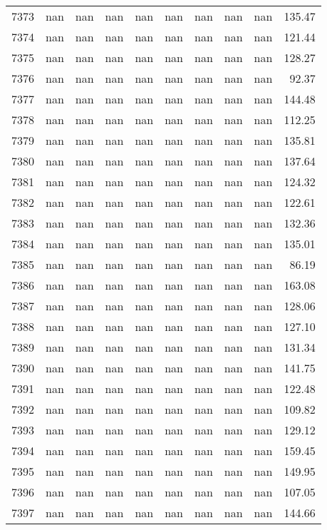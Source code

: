 \begin{tabular}{lrrrrrrrrr}
7373 & nan & nan & nan & nan & nan & nan & nan & nan & 135.47 \\
7374 & nan & nan & nan & nan & nan & nan & nan & nan & 121.44 \\
7375 & nan & nan & nan & nan & nan & nan & nan & nan & 128.27 \\
7376 & nan & nan & nan & nan & nan & nan & nan & nan & 92.37 \\
7377 & nan & nan & nan & nan & nan & nan & nan & nan & 144.48 \\
7378 & nan & nan & nan & nan & nan & nan & nan & nan & 112.25 \\
7379 & nan & nan & nan & nan & nan & nan & nan & nan & 135.81 \\
7380 & nan & nan & nan & nan & nan & nan & nan & nan & 137.64 \\
7381 & nan & nan & nan & nan & nan & nan & nan & nan & 124.32 \\
7382 & nan & nan & nan & nan & nan & nan & nan & nan & 122.61 \\
7383 & nan & nan & nan & nan & nan & nan & nan & nan & 132.36 \\
7384 & nan & nan & nan & nan & nan & nan & nan & nan & 135.01 \\
7385 & nan & nan & nan & nan & nan & nan & nan & nan & 86.19 \\
7386 & nan & nan & nan & nan & nan & nan & nan & nan & 163.08 \\
7387 & nan & nan & nan & nan & nan & nan & nan & nan & 128.06 \\
7388 & nan & nan & nan & nan & nan & nan & nan & nan & 127.10 \\
7389 & nan & nan & nan & nan & nan & nan & nan & nan & 131.34 \\
7390 & nan & nan & nan & nan & nan & nan & nan & nan & 141.75 \\
7391 & nan & nan & nan & nan & nan & nan & nan & nan & 122.48 \\
7392 & nan & nan & nan & nan & nan & nan & nan & nan & 109.82 \\
7393 & nan & nan & nan & nan & nan & nan & nan & nan & 129.12 \\
7394 & nan & nan & nan & nan & nan & nan & nan & nan & 159.45 \\
7395 & nan & nan & nan & nan & nan & nan & nan & nan & 149.95 \\
7396 & nan & nan & nan & nan & nan & nan & nan & nan & 107.05 \\
7397 & nan & nan & nan & nan & nan & nan & nan & nan & 144.66 \\

\end{tabular}
